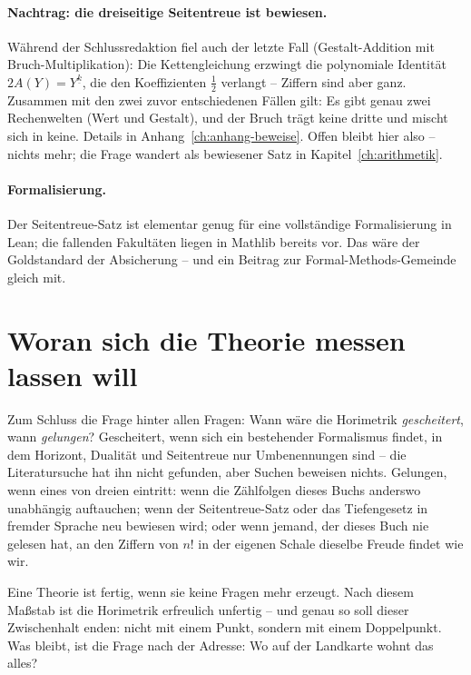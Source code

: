 \paragraph{Nachtrag: die dreiseitige Seitentreue ist bewiesen.}
Während der Schlussredaktion fiel auch der letzte Fall
(Gestalt-Addition mit Bruch-Multiplikation): Die Kettengleichung
erzwingt die polynomiale Identität $2A(Y)=Y^{\underline{k}}$, die
den Koeffizienten $\tfrac12$ verlangt -- Ziffern sind aber ganz.
Zusammen mit den zwei zuvor entschiedenen Fällen gilt: Es gibt genau
zwei Rechenwelten (Wert und Gestalt), und der Bruch trägt keine
dritte und mischt sich in keine. Details in
Anhang~\ref{ch:anhang-beweise}. Offen bleibt hier also -- nichts
mehr; die Frage wandert als bewiesener Satz in
Kapitel~\ref{ch:arithmetik}.

\paragraph{Formalisierung.} Der Seitentreue-Satz ist elementar
genug für eine vollständige Formalisierung in Lean; die fallenden
Fakultäten liegen in Mathlib bereits vor. Das wäre der Goldstandard
der Absicherung -- und ein Beitrag zur Formal-Methods-Gemeinde
gleich mit.

\section{Woran sich die Theorie messen lassen will}

Zum Schluss die Frage hinter allen Fragen: Wann wäre die Horimetrik
\emph{gescheitert}, wann \emph{gelungen}? Gescheitert, wenn sich
ein bestehender Formalismus findet, in dem Horizont, Dualität und
Seitentreue nur Umbenennungen sind -- die Literatursuche hat ihn
nicht gefunden, aber Suchen beweisen nichts. Gelungen, wenn eines
von dreien eintritt: wenn die Zählfolgen dieses Buchs anderswo
unabhängig auftauchen; wenn der Seitentreue-Satz oder das
Tiefengesetz in fremder Sprache neu bewiesen wird; oder wenn
jemand, der dieses Buch nie gelesen hat, an den Ziffern von $n!$
in der eigenen Schale dieselbe Freude findet wie wir.

\begin{oberflaeche}
Eine Theorie ist fertig, wenn sie keine Fragen mehr erzeugt. Nach
diesem Maßstab ist die Horimetrik erfreulich unfertig -- und genau
so soll dieser Zwischenhalt enden: nicht mit einem Punkt, sondern
mit einem Doppelpunkt. Was bleibt, ist die Frage nach der Adresse:
Wo auf der Landkarte wohnt das alles?
\end{oberflaeche}
